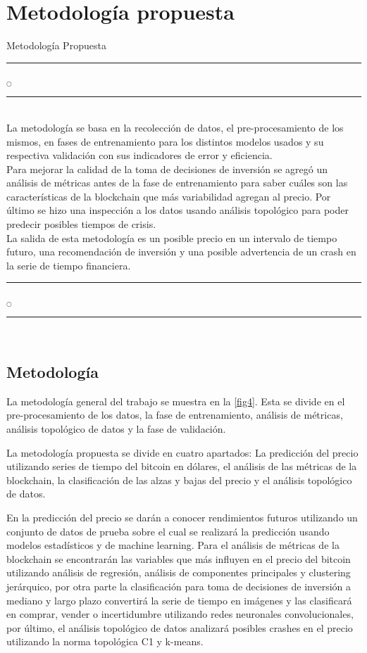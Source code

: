 \chapter[Metodología]{Metodología propuesta}{Metodología Propuesta}\label{Metodologia}

\noindent
\rule{0.49\textwidth}{0.75pt} $_{\bigcirc}$ \rule{0.49\textwidth}{0.75pt}\\

La metodología se basa en la recolección de datos, el pre-procesamiento de los mismos, en fases de entrenamiento para los distintos modelos usados y su respectiva validación con sus indicadores de error y eficiencia.\\
Para mejorar la calidad de la toma de decisiones de inversión se agregó un análisis de métricas antes de la fase de entrenamiento para saber cuáles son las características de la blockchain que más variabilidad agregan al precio. Por último se hizo una inspección a los datos usando análisis topológico para poder predecir posibles tiempos de crisis.\\
La salida de esta metodología es un posible precio en un intervalo de tiempo futuro, una recomendación de inversión y una posible advertencia de un crash en la serie de tiempo financiera.\\

\noindent
\rule{0.49\textwidth}{0.75pt} $_{\bigcirc}$ \rule{0.49\textwidth}{0.75pt}\\
\clearpage

\section{Metodología}
La metodología general del trabajo se muestra en la \autoref{fig4}. Esta se divide en el pre-procesamiento de los datos, la fase de entrenamiento, análisis de métricas, análisis topológico de datos y la fase de validación.

La metodología propuesta se divide en cuatro apartados: La predicción del precio utilizando series de tiempo del bitcoin en dólares, el análisis de las métricas de la blockchain, la clasificación de las alzas y bajas del precio y el análisis topológico de datos.
 
En la predicción del precio se darán a conocer rendimientos futuros utilizando un conjunto de datos de prueba sobre el cual se realizará la predicción usando modelos estadísticos y de machine learning. Para el análisis de métricas de la blockchain se encontrarán las variables que más influyen en el precio del bitcoin utilizando análisis de regresión, análisis de componentes principales y clustering jerárquico, por otra parte la clasificación para toma de decisiones de inversión a mediano y largo plazo convertirá la serie de tiempo en imágenes y las clasificará en comprar, vender o incertidumbre utilizando redes neuronales convolucionales, por último, el análisis topológico de datos analizará posibles crashes en el precio utilizando la norma topológica C1 y k-means. 

